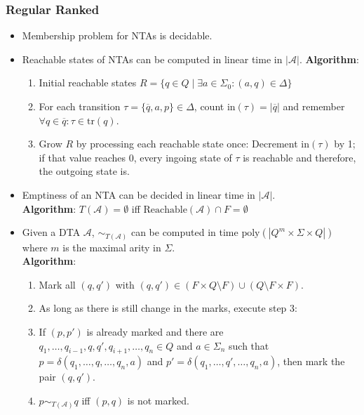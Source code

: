 \documentclass{article}
\begin{document}
\subsubsection{Regular Ranked}
\begin{itemize}
	\item Membership problem for NTAs is decidable.
	\item Reachable states of NTAs can be computed in linear time in $|\mathcal{A}|$.
		\textbf{Algorithm}: 
		\begin{enumerate}
			\item Initial reachable states $R = \{ q \in Q \mid \exists a \in \Sigma_0: (a, q) \in \Delta \}$
			\item For each transition $\tau = \{\overline{q}, a, p\} \in \Delta$, count $\text{in}(\tau) = |\overline{q}|$ and remember $\forall q \in \overline{q}: \tau \in \text{tr}(q)$.
			\item Grow $R$ by processing each reachable state once: Decrement $\text{in}(\tau)$ by 1; if that value reaches 0, every ingoing state of $\tau$ is reachable and therefore, the outgoing state is.
		\end{enumerate}
	\item Emptiness of an NTA can be decided in linear time in $|\mathcal{A}|$. \\
		\textbf{Algorithm}: $T(\mathcal{A}) = \emptyset$ iff $\text{Reachable}(\mathcal{A}) \cap F = \emptyset$
	\item Given a DTA $\mathcal{A}$, $\sim_{T(\mathcal{A})}$ can be computed in time $\text{poly}(|Q^m \times \Sigma \times Q|)$ where $m$ is the maximal arity in $\Sigma$. \\
		\textbf{Algorithm}: 
		\begin{enumerate}
			\item Mark all $(q, q')$ with $(q, q') \in (F \times Q \setminus F) \cup (Q \setminus F \times F)$.
			\item As long as there is still change in the marks, execute step 3:
			\item If $(p, p')$ is already marked and there are $q_1, \dots, q_{i-1}, q, q', q_{i+1}, \dots, q_n \in Q$ and $a \in \Sigma_n$ such that $p = \delta(q_1, \dots, q, \dots, q_n, a)$ and $p' = \delta(q_1, \dots, q', \dots, q_n, a)$, then mark the pair $(q, q')$. 
			\item $p \sim_{T(\mathcal{A})} q$ iff $(p, q)$ is not marked.
		\end{enumerate}
\end{itemize}
\end{document}

